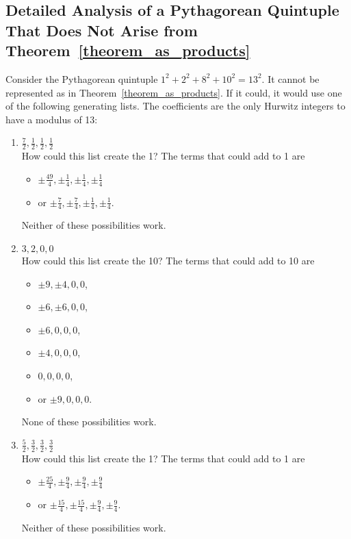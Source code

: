 \documentclass[12pt]{article}
\theoremstyle{definition}
\numberwithin{equation}{section}
\begin{document}
\begin{appendices}

\section{Detailed Analysis of a Pythagorean Quintuple That Does Not Arise from
Theorem~\ref{theorem_as_products}}
\label{appendix_A}



Consider the Pythagorean quintuple
$1^2 + 2^2 + 8^2 + 10^2 = 13^2$.
It
cannot be represented as in
Theorem~\ref{theorem_as_products}.
If it could, it would use one of the following generating lists.
The
coefficients are the only Hurwitz integers to have a modulus of 13:



\begin{enumerate}

\item $ \frac{7}{2},\frac{1}{2}, \frac{1}{2}, \frac{1}{2}  $\\
How could this list create the 1?
The terms that could add to 1 are
\begin{itemize}
\item $ \pm\frac{49}{4},\pm\frac{1}{4}, \pm\frac{1}{4}, \pm\frac{1}{4}  $  
\item or $ \pm\frac{7}{4},\pm\frac{7}{4}, \pm\frac{1}{4}, \pm\frac{1}{4}  $. 
\end{itemize}
Neither of these possibilities work.


\item $3,2,0,0$\\
How could this list create the 10?
The terms that could add to 10 are
\begin{itemize}
\item$ \pm9,\pm4, 0, 0  $,
\item$ \pm6,\pm6, 0, 0  $,
\item$ \pm6,0, 0, 0  $,
\item$ \pm4,0, 0, 0  $,
\item$ 0,0, 0, 0  $,
\item or $ \pm9,0, 0, 0  $.
\end{itemize}
None of these possibilities work.


\item $ \frac{5}{2},\frac{3}{2}, \frac{3}{2}, \frac{3}{2}  $\\
How could this list create the 1?
The terms that could add to 1 are
\begin{itemize}
\item$ \pm\frac{25}{4},\pm\frac{9}{4}, \pm\frac{9}{4}, \pm\frac{9}{4}  $  
\item or $ \pm\frac{15}{4},\pm\frac{15}{4}, \pm\frac{9}{4}, \pm\frac{9}{4}  $. 
\end{itemize}
Neither of these possibilities work.




\end{enumerate}
\end{appendices}
\end{document}
